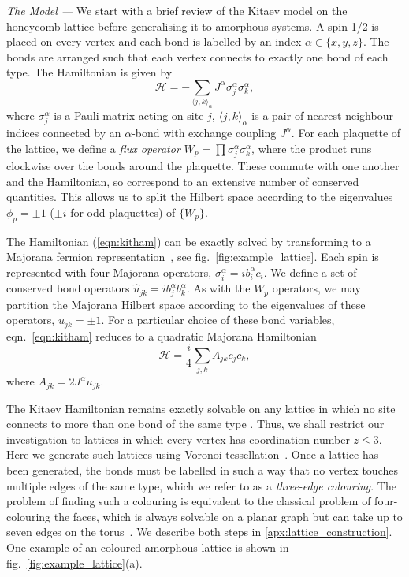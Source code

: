 \documentclass[%
 reprint,
superscriptaddress,
 amsmath,amssymb,
aps,
]{revtex4-2}
\begin{document}
{\it The Model ---} 
We start with a brief review of the Kitaev model on the honeycomb lattice \cite{kitaevAnyonsExactlySolved2006} before generalising it to amorphous systems. A spin-1/2 is placed on every vertex and each bond is labelled by an index $\alpha \in \{ x, y, z\}$. The bonds are arranged such that each vertex connects to exactly one bond of each type. The Hamiltonian is given by
\begin{equation}
    \label{eqn:kitham}
    \mathcal{H} = - \sum_{\langle j,k\rangle_\alpha} J^{\alpha}\sigma_j^{\alpha}\sigma_k^{\alpha},
\end{equation}
where $\sigma^\alpha_j$ is a Pauli matrix acting on site $j$, \(\langle j,k\rangle_\alpha\) is a pair of nearest-neighbour indices connected by an $\alpha$-bond with exchange coupling $J^\alpha$. For each plaquette of the lattice, we define a {\it flux operator} $ W_p = \prod \sigma_j^{\alpha}\sigma_k^{\alpha}$, where the product runs clockwise over the bonds around the plaquette. These commute with one another and the Hamiltonian, so correspond to an extensive number of conserved quantities. This allows us to split the Hilbert space according to the eigenvalues $\phi_p = \pm 1$ ($\pm i$ for odd plaquettes) of $\{W_p\}$.

The Hamiltonian (\ref{eqn:kitham}) can be exactly solved by transforming to a Majorana fermion representation~\cite{kitaevAnyonsExactlySolved2006}, see fig.~\ref{fig:example_lattice}. Each spin is represented with four Majorana operators, $\sigma_i^\alpha = i b_i^\alpha c_i$. We define a set of conserved bond operators $\hat u_{jk} = ib_j^{\alpha}b_k^{\alpha}$. As with the $W_p$ operators, we may partition the Majorana Hilbert space according to the eigenvalues of these operators, $u_{jk}=\pm 1$. For a particular choice of these bond variables, eqn.~\ref{eqn:kitham} reduces to a quadratic Majorana Hamiltonian
\begin{equation}\label{eqn:majorana_hamiltonian}
    \mathcal{H} = \frac{i}{4}\sum_{ j,k }A_{jk} c_j c_k,
\end{equation}
where $A_{jk}=2J^{\alpha}u_{jk}$.

The Kitaev Hamiltonian remains exactly solvable on any lattice in which no site connects to more than one bond of the same type \cite{Nussinov2009}. Thus, we shall restrict our investigation to lattices in which every vertex has coordination number $z \leq 3$. Here we generate such lattices using Voronoi tessellation~\cite{florescu_designer_2009}. Once a lattice has been generated, the bonds must be labelled in such a way that no vertex touches multiple edges of the same type, which we refer to as a \textit{three-edge colouring}. The problem of finding such a colouring is equivalent to the classical problem of four-colouring the faces, which is always solvable on a planar graph \cite{Tait1880, appelEveryPlanarMap1989a} but can take up to seven edges on the torus~\cite{ringel_solution_1968}. We describe both steps in \cref{apx:lattice_construction}. One example of an coloured amorphous lattice is shown in fig.~\ref{fig:example_lattice}(a). 
\end{document}
